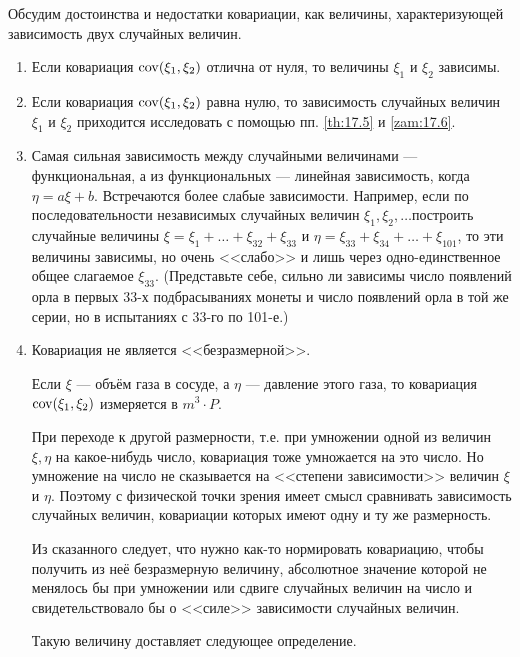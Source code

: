 \begin{zam}\label{zam:19.6}
Обсудим достоинства и недостатки ковариации, как
величины, характеризующей зависимость двух случайных величин.
\begin{enumerate}
	\item Если ковариация $\operatorname{cov}(\xi_1, \xi_2)$ отлична от нуля, то величины 
	$\xi_1$ и $\xi_2$ зависимы.
	
	\item Если ковариация $\operatorname{cov}(\xi_1, \xi_2)$ равна нулю, то зависимость случайных
	величин $\xi_1$ и $\xi_2$ приходится исследовать с помощью пп. \ref{th:17.5} и \ref{zam:17.6}.
	
	\item Самая сильная зависимость между случайными величинами — функциональная, а из функциональных — линейная зависимость, когда $\eta =
	a \xi + b$. Встречаются более слабые зависимости. Например, если по последовательности независимых случайных величин $\xi_1, \xi_2, \dots$построить случайные величины $\xi = \xi_1 +\dots + \xi_{32} + \xi_{33}$ и $\eta = \xi_{33} + \xi_{34}+\dots + \xi_{101}$, то эти
	величины зависимы, но очень <<слабо>> и лишь через одно-единственное общее слагаемое $\xi_{33}$. (Представьте себе, сильно ли зависимы число появлений
	орла в первых 33-х подбрасываниях монеты и число появлений орла в той
	же серии, но в испытаниях с 33-го по 101-е.)

	\item Ковариация не является <<безразмерной>>. 

	Если $\xi$ — объём газа в сосуде, а $\eta$ — давление этого газа, то ковариация $\operatorname{cov}(\xi_1, \xi_2)$ измеряется в $ m^3 \cdot P $. 

	При переходе к другой размерности, т.е. при умножении одной из величин $\xi, \eta$ на какое-нибудь число, ковариация тоже умножается на это число. Но умножение на число не сказывается на <<степени зависимости>> величин $\xi$ и $\eta$. Поэтому с физической точки зрения имеет смысл сравнивать зависимость случайных величин, ковариации которых имеют одну и ту же размерность.

	Из сказанного следует, что нужно как-то нормировать ковариацию,
	чтобы получить из неё безразмерную величину, абсолютное значение которой не менялось бы при умножении или сдвиге случайных величин на число и свидетельствовало бы о <<силе>> зависимости случайных величин.

	Такую величину доставляет следующее определение.
\end{enumerate}
\end{zam}

